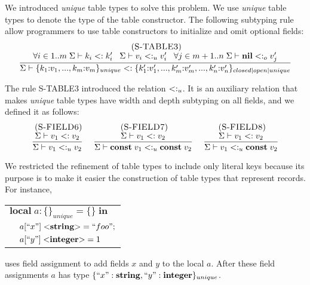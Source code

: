 We introduced \emph{unique} table types to solve this problem.
We use \emph{unique} table types to denote the type of the
table constructor.
The following subtyping rule allow programmers to use table constructors
to initialize and omit optional fields:
\[
\begin{array}{c}
\; (\textsc{S-TABLE3})\\
\dfrac{\forall i \in 1..m \; \Sigma \vdash k_{i} <: k_{i}' \;\;\;
       \Sigma \vdash v_{i} <:_{u} v_{i}' \;\;\;
       \forall j \in m+1..n \; \Sigma \vdash \mathbf{nil} <:_{o} v_{j}'}
      {\Sigma \vdash \{k_{1}{:}v_{1}, ..., k_{m}{:}v_{m}\}_{unique} <:
                    \{k_{1}'{:}v_{1}', ..., k_{m}'{:}v_{m}', ..., k_{n}'{:}v_{n}'\}_{closed|open|unique}}
\end{array}
\]

The rule \textsc{S-TABLE3} introduced the relation $<:_{u}$.
It is an auxiliary relation that makes \emph{unique} table types
have width and depth subtyping on all fields, and we defined it
as follows:
\[
\begin{array}{c}
\begin{array}{c}
\; (\textsc{S-FIELD6})\\
\dfrac{\Sigma \vdash v_{1} <: v_{2}}
      {\Sigma \vdash v_{1} <:_{u} v_{2}}
\end{array}
\;
\begin{array}{c}
\; (\textsc{S-FIELD7})\\
\dfrac{\Sigma \vdash v_{1} <: v_{2}}
      {\Sigma \vdash \mathbf{const} \; v_{1} <:_{u} \mathbf{const} \; v_{2}}
\end{array}
\;
\begin{array}{c}
\; (\textsc{S-FIELD8})\\
\dfrac{\Sigma \vdash v_{1} <: v_{2}}
      {\Sigma \vdash v_{1} <:_{u} \mathbf{const} \; v_{2}}
\end{array}
\end{array}
\]

We restricted the refinement of table types to include only literal
keys because its purpose is to make it easier the construction of
table types that represent records.
For instance,
\begin{center}
\begin{tabular}{ll}
\multicolumn{2}{l}{$\mathbf{local} \; a:\{\}_{unique} = \{\} \; \mathbf{in}$}\\
& \multicolumn{1}{l}{$a[``x"] \; {<}\mathbf{string}{>} = ``foo";$}\\
& \multicolumn{1}{l}{$a[``y"] \; {<}\mathbf{integer}{>} = 1$}\\
\end{tabular}
\end{center}
uses field assignment to add fields $x$ and $y$ to the local $a$.
After these field assignments $a$ has type
$\{``x":\mathbf{string}, ``y":\mathbf{integer}\}_{unique}$.

